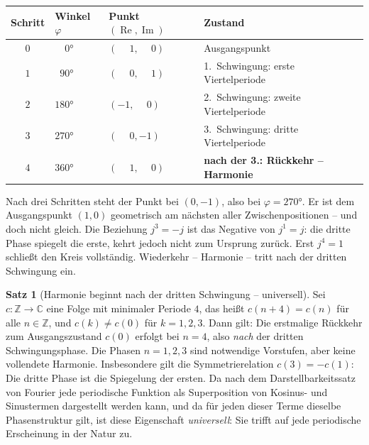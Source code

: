 ﻿\documentclass[a4paper,12pt]{article}
\theoremstyle{definition}
\newtheorem{theorem}{Satz}[section]
\begin{document}
\begin{center}
\begin{tabular}{clll}
	\toprule
	Schritt & Winkel $\varphi$ & Punkt $(\operatorname{Re},\operatorname{Im})$
	& Zustand \\
	\midrule
	$0$ & $\phantom{00}0 °$ & $(\phantom{-}1,\phantom{-}0)$
	& Ausgangspunkt \\
	$1$ & $\phantom{0}90 °$ & $(\phantom{-}0,\phantom{-}1)$
	& 1.~Schwingung: erste Viertelperiode \\
	$2$ & $180 °$ & $(-1,\phantom{-}0)$
	& 2.~Schwingung: zweite Viertelperiode \\
	$3$ & $270 °$ & $(\phantom{-}0,-1)$
	& 3.~Schwingung: dritte Viertelperiode \\
	$4$ & $360 °$ & $(\phantom{-}1,\phantom{-}0)$
	& \textbf{nach der 3.: Rückkehr -- Harmonie} \\
	\bottomrule
\end{tabular}
\end{center}

Nach drei Schritten steht der Punkt bei $(0, -1)$, also bei $\varphi = 270 °$. Er ist
dem Ausgangspunkt $(1, 0)$ geometrisch am nächsten aller Zwischenpositionen -- und
doch nicht gleich. Die Beziehung $j^3 = -j$ ist das Negative von $j^1 = j$:
die dritte Phase spiegelt die erste, kehrt jedoch nicht zum Ursprung zurück.
Erst $j^4 = 1$ schließt den Kreis vollständig. Wiederkehr -- Harmonie --
tritt nach der dritten Schwingung ein.

\begin{theorem}[Harmonie beginnt nach der dritten Schwingung -- universell]
	Sei $c\colon \mathbb{Z} \to \mathbb{C}$ eine Folge mit minimaler Periode $4$,
	das heißt $c(n+4) = c(n)$ für alle $n \in \mathbb{Z}$, und
	$c(k) \neq c(0)$ für $k = 1, 2, 3$. Dann gilt: Die erstmalige Rückkehr zum
	Ausgangszustand $c(0)$ erfolgt bei $n = 4$, also \emph{nach} der dritten
	Schwingungsphase. Die Phasen $n = 1, 2, 3$ sind notwendige Vorstufen,
	aber keine vollendete Harmonie. Insbesondere gilt die Symmetrierelation
	$c(3) = -c(1)$: Die dritte Phase ist die Spiegelung der ersten.
	Da nach dem Darstellbarkeitssatz von Fourier jede periodische Funktion als
	Superposition von Kosinus- und Sinustermen dargestellt werden kann, und da für
	jeden dieser Terme dieselbe Phasenstruktur gilt, ist diese Eigenschaft
	\emph{universell}: Sie trifft auf jede periodische Erscheinung in der Natur zu.
\end{theorem}
\end{document}
